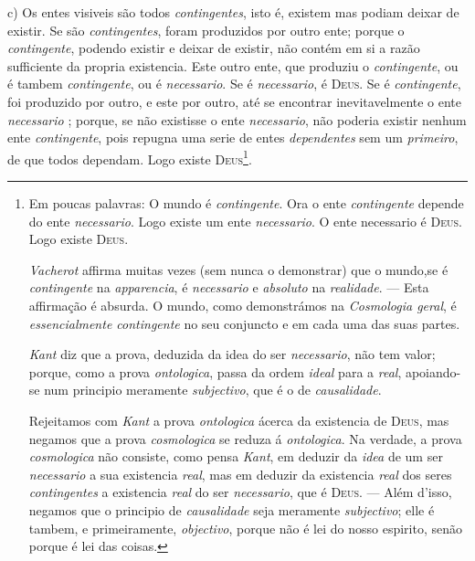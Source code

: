 c) Os entes visiveis são todos \emph{contingentes}, isto é, existem mas podiam deixar de existir. Se são \emph{contingentes}, foram produzidos por outro ente; porque o \emph{contingente}, podendo existir e deixar de existir, não contém em si a razão sufficiente da propria existencia. Este outro ente, que produziu o \emph{contingente}, ou é tambem \emph{contingente}, ou é \emph{necessario}. Se é \emph{necessario}, é \textsc{Deus}. Se é \emph{contingente}, foi produzido por outro, e este por outro, até se encontrar inevitavelmente o ente \emph{necessario} ; porque, se não existisse o ente \emph{necessario}, não poderia existir nenhum ente \emph{contingente}, pois repugna uma serie de entes \emph{dependentes} sem um \emph{primeiro}, de que todos dependam. Logo existe \textsc{Deus}\footnote{Em poucas palavras: O mundo é \emph{contingente}. Ora o ente \emph{contingente} depende do ente \emph{necessario}. Logo existe um ente \emph{necessario}. O ente necessario é \textsc{Deus}. Logo existe \textsc{Deus}.\par \emph{Vacherot} affirma muitas vezes (sem nunca o demonstrar) que o mundo,se é \emph{contingente} na \emph{apparencia}, é \emph{necessario} e \emph{absoluto} na \emph{realidade}. --- Esta affirmação é absurda. O mundo, como demonstrámos na \emph{Cosmologia geral}, é \emph{essencialmente contingente} no seu conjuncto e em cada uma das suas partes.\par \emph{Kant} diz que a prova, deduzida da idea do ser \emph{necessario}, não tem valor; porque, como a prova \emph{ontologica}, passa da ordem \emph{ideal} para a \emph{real}, apoiando-se num principio meramente \emph{subjectivo}, que é o de \emph{causalidade}.\par Rejeitamos com \emph{Kant} a prova \emph{ontologica} ácerca da existencia de \textsc{Deus}, mas negamos que a prova \emph{cosmologica} se reduza á \emph{ontologica}. Na verdade, a prova \emph{cosmologica} não consiste, como pensa \emph{Kant}, em deduzir da \emph{idea} de um ser \emph{necessario} a sua existencia \emph{real}, mas em deduzir da existencia \emph{real} dos seres \emph{contingentes} a existencia \emph{real} do ser \emph{necessario}, que é \textsc{Deus}. --- Além d'isso, negamos que o principio de \emph{causalidade} seja meramente \emph{subjectivo}; elle é tambem, e primeiramente, \emph{objectivo}, porque não é lei do nosso espirito, senão porque é lei das coisas.}.
